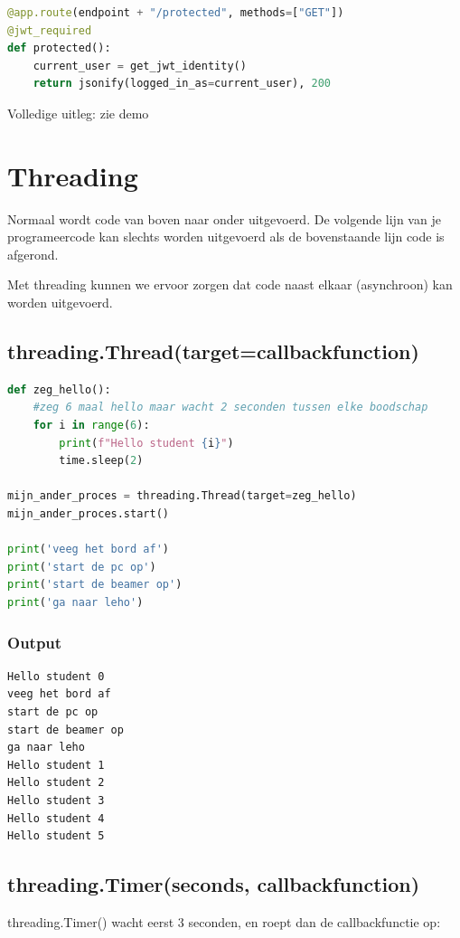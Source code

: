 \documentclass{article}
\begin{document}
\begin{lstlisting}[language=Python]
@app.route(endpoint + "/protected", methods=["GET"])
@jwt_required
def protected():
    current_user = get_jwt_identity()
    return jsonify(logged_in_as=current_user), 200
\end{lstlisting}

Volledige uitleg: zie demo

\section{Threading}
Normaal wordt code van boven naar onder uitgevoerd. 
De volgende lijn van je programeercode kan slechts worden uitgevoerd als de bovenstaande lijn code is afgerond.

Met threading kunnen we ervoor zorgen dat code naast elkaar (asynchroon) kan worden uitgevoerd.

\subsection{threading.Thread(target=callbackfunction)}


\begin{lstlisting}[language=Python]
    def zeg_hello():
    #zeg 6 maal hello maar wacht 2 seconden tussen elke boodschap
    for i in range(6):
        print(f"Hello student {i}")
        time.sleep(2)

mijn_ander_proces = threading.Thread(target=zeg_hello)
mijn_ander_proces.start()

print('veeg het bord af')
print('start de pc op')
print('start de beamer op')
print('ga naar leho')
\end{lstlisting}

\subsubsection{Output}

\begin{lstlisting}
Hello student 0
veeg het bord af
start de pc op
start de beamer op
ga naar leho
Hello student 1
Hello student 2
Hello student 3
Hello student 4
Hello student 5
\end{lstlisting}

\subsection{threading.Timer(seconds, callbackfunction)}

threading.Timer() wacht eerst 3 seconden, en roept dan de callbackfunctie op:
\end{document}
